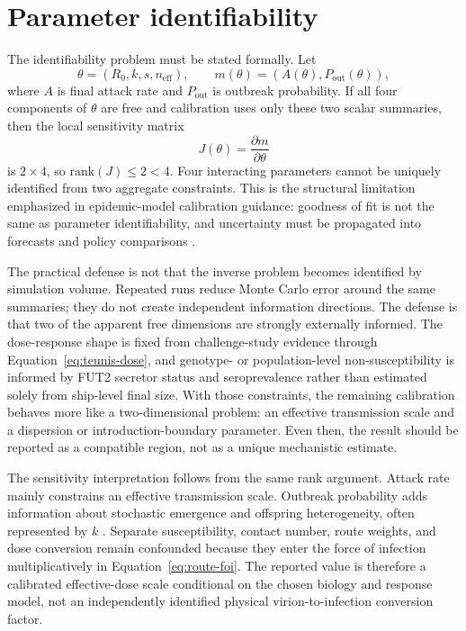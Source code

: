 \section{Parameter identifiability}
The identifiability problem must be stated formally. Let
\begin{equation}
  \theta=(R_0,k,s,n_{\mathrm{eff}}), \qquad
  m(\theta)=\left(A(\theta),P_{\mathrm{out}}(\theta)\right),
\end{equation}
where \(A\) is final attack rate and \(P_{\mathrm{out}}\) is outbreak probability. If all four components of
\(\theta\) are free and calibration uses only these two scalar summaries, then the local sensitivity matrix
\begin{equation}
  J(\theta)=\frac{\partial m}{\partial\theta}
\end{equation}
is \(2\times4\), so \(\mathrm{rank}(J)\le2<4\). Four interacting parameters cannot be uniquely identified from two
aggregate constraints. This is the structural limitation emphasized in epidemic-model calibration guidance:
goodness of fit is not the same as parameter identifiability, and uncertainty must be propagated into forecasts and
policy comparisons \citep{Chowell2017Fitting}.

The practical defense is not that the inverse problem becomes identified by simulation volume. Repeated runs reduce
Monte Carlo error around the same summaries; they do not create independent information directions. The defense is
that two of the apparent free dimensions are strongly externally informed. The dose-response shape is fixed from
challenge-study evidence through Equation~\ref{eq:teunis-dose}, and genotype- or population-level
non-susceptibility is informed by FUT2 secretor status and seroprevalence rather than estimated solely from
ship-level final size. With those constraints, the remaining calibration behaves more like a two-dimensional
problem: an effective transmission scale and a dispersion or introduction-boundary parameter. Even then, the result
should be reported as a compatible region, not as a unique mechanistic estimate.

The sensitivity interpretation follows from the same rank argument. Attack rate mainly constrains an effective
transmission scale. Outbreak probability adds information about stochastic emergence and offspring heterogeneity,
often represented by \(k\) \citep{LloydSmith2005,LloydSmith2007}. Separate susceptibility, contact number, route
weights, and dose conversion remain confounded because they enter the force of infection multiplicatively in
Equation~\ref{eq:route-foi}. The reported  value is therefore a calibrated effective-dose scale
conditional on the chosen biology and response model, not an independently identified physical virion-to-infection
conversion factor.

